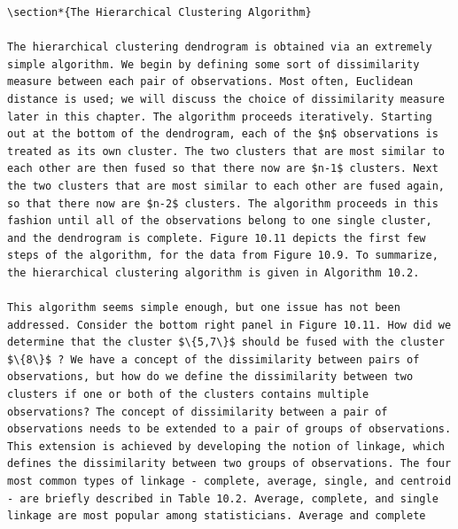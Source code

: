 \documentclass[10pt]{article}
\begin{document}
\begin{verbatim}
\section*{The Hierarchical Clustering Algorithm}

The hierarchical clustering dendrogram is obtained via an extremely simple algorithm. We begin by defining some sort of dissimilarity measure between each pair of observations. Most often, Euclidean distance is used; we will discuss the choice of dissimilarity measure later in this chapter. The algorithm proceeds iteratively. Starting out at the bottom of the dendrogram, each of the $n$ observations is treated as its own cluster. The two clusters that are most similar to each other are then fused so that there now are $n-1$ clusters. Next the two clusters that are most similar to each other are fused again, so that there now are $n-2$ clusters. The algorithm proceeds in this fashion until all of the observations belong to one single cluster, and the dendrogram is complete. Figure 10.11 depicts the first few steps of the algorithm, for the data from Figure 10.9. To summarize, the hierarchical clustering algorithm is given in Algorithm 10.2.

This algorithm seems simple enough, but one issue has not been addressed. Consider the bottom right panel in Figure 10.11. How did we determine that the cluster $\{5,7\}$ should be fused with the cluster $\{8\}$ ? We have a concept of the dissimilarity between pairs of observations, but how do we define the dissimilarity between two clusters if one or both of the clusters contains multiple observations? The concept of dissimilarity between a pair of observations needs to be extended to a pair of groups of observations. This extension is achieved by developing the notion of linkage, which defines the dissimilarity between two groups of observations. The four most common types of linkage - complete, average, single, and centroid - are briefly described in Table 10.2. Average, complete, and single linkage are most popular among statisticians. Average and complete


\end{verbatim}
\end{document}
